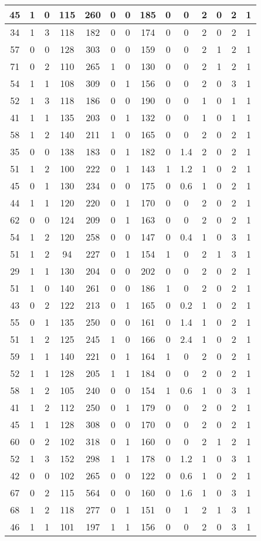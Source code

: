 \documentclass{article}
\begin{document}
\begin{tabular}{
|c|c|c|c|c|c|c|c|c|c|c|c|c|c|}
\hline
45&1&0&115&260&0&0&185&0&0&2&0&2&1 \\
\hline
34&1&3&118&182&0&0&174&0&0&2&0&2&1 \\
\hline
57&0&0&128&303&0&0&159&0&0&2&1&2&1 \\
\hline
71&0&2&110&265&1&0&130&0&0&2&1&2&1 \\
\hline
54&1&1&108&309&0&1&156&0&0&2&0&3&1 \\
\hline
52&1&3&118&186&0&0&190&0&0&1&0&1&1 \\
\hline
41&1&1&135&203&0&1&132&0&0&1&0&1&1 \\
\hline
58&1&2&140&211&1&0&165&0&0&2&0&2&1 \\
\hline
35&0&0&138&183&0&1&182&0&1.4&2&0&2&1 \\
\hline
51&1&2&100&222&0&1&143&1&1.2&1&0&2&1 \\
\hline
45&0&1&130&234&0&0&175&0&0.6&1&0&2&1 \\
\hline
44&1&1&120&220&0&1&170&0&0&2&0&2&1 \\
\hline
62&0&0&124&209&0&1&163&0&0&2&0&2&1 \\
\hline
54&1&2&120&258&0&0&147&0&0.4&1&0&3&1 \\
\hline
51&1&2&94&227&0&1&154&1&0&2&1&3&1 \\
\hline
29&1&1&130&204&0&0&202&0&0&2&0&2&1 \\
\hline
51&1&0&140&261&0&0&186&1&0&2&0&2&1 \\
\hline
43&0&2&122&213&0&1&165&0&0.2&1&0&2&1 \\
\hline
55&0&1&135&250&0&0&161&0&1.4&1&0&2&1 \\
\hline
51&1&2&125&245&1&0&166&0&2.4&1&0&2&1 \\
\hline
59&1&1&140&221&0&1&164&1&0&2&0&2&1 \\
\hline
52&1&1&128&205&1&1&184&0&0&2&0&2&1 \\
\hline
58&1&2&105&240&0&0&154&1&0.6&1&0&3&1 \\
\hline
41&1&2&112&250&0&1&179&0&0&2&0&2&1 \\
\hline
45&1&1&128&308&0&0&170&0&0&2&0&2&1 \\
\hline
60&0&2&102&318&0&1&160&0&0&2&1&2&1 \\
\hline
52&1&3&152&298&1&1&178&0&1.2&1&0&3&1 \\
\hline
42&0&0&102&265&0&0&122&0&0.6&1&0&2&1 \\
\hline
67&0&2&115&564&0&0&160&0&1.6&1&0&3&1 \\
\hline
68&1&2&118&277&0&1&151&0&1&2&1&3&1 \\
\hline
46&1&1&101&197&1&1&156&0&0&2&0&3&1 \\

\end{tabular}
\end{document}
